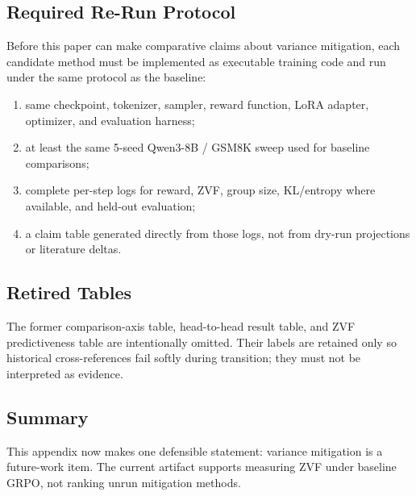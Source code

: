 \subsection{Required Re-Run Protocol}
\label{sec:variance-integration}

Before this paper can make comparative claims about variance mitigation, each
candidate method must be implemented as executable training code and run under
the same protocol as the baseline:
\begin{enumerate}
  \item same checkpoint, tokenizer, sampler, reward function, LoRA adapter,
  optimizer, and evaluation harness;
  \item at least the same 5-seed Qwen3-8B / GSM8K sweep used for baseline
  comparisons;
  \item complete per-step logs for reward, ZVF, group size, KL/entropy where
  available, and held-out evaluation;
  \item a claim table generated directly from those logs, not from dry-run
  projections or literature deltas.
\end{enumerate}

\subsection{Retired Tables}
\label{sec:variance-head2head}
\label{sec:variance-honesty}
\label{sec:variance-zvf-stress}
\label{tab:variance-axes}
\label{tab:variance-head2head}
\label{tab:variance-zvf-rho}

The former comparison-axis table, head-to-head result table, and ZVF
predictiveness table are intentionally omitted. Their labels are retained only
so historical cross-references fail softly during transition; they must not be
interpreted as evidence.

\subsection{Summary}
\label{sec:variance-summary}

This appendix now makes one defensible statement: variance mitigation is a
future-work item. The current artifact supports measuring ZVF under baseline
GRPO, not ranking unrun mitigation methods.
